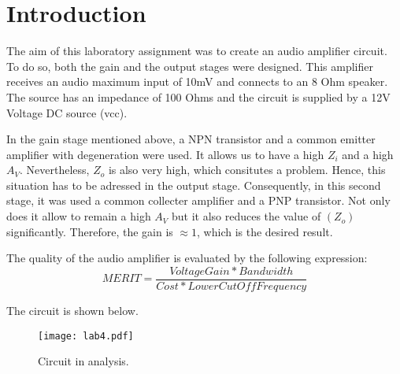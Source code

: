 \section{Introduction}
\label{introduction}


\par The aim of this laboratory assignment was to create an audio amplifier circuit. To do so, both the gain and the output stages were designed. This amplifier receives an audio maximum input of 10mV and connects to an 8 Ohm speaker. The source has an impedance of 100 Ohms and the circuit is supplied by a 12V Voltage DC source (vcc).
\par In the gain stage mentioned above, a NPN transistor and a common emitter amplifier with degeneration were used. It allows us to have a high $Z_{i}$ and a high $A_{V}$. Nevertheless, $Z_{o}$ is also very high, which consitutes a problem. Hence, this situation has to be adressed in the output stage. Consequently, in this second stage, it was used a common collecter amplifier and a PNP transistor. Not only does it allow to remain a high $A_{V}$ but it also reduces the value of $(Z_{o})$ significantly. Therefore, the gain is $\approx 1$, which is the desired result.

\par The quality of the audio amplifier is evaluated by the following expression:
\begin {equation}
	 MERIT = \frac{Voltage Gain*Bandwidth}{Cost*Lower Cut Off Frequency}   	
	\label{merit}
\end{equation}

The circuit is shown below.

\begin{figure}[ht] \centering
\texttt{[image: lab4.pdf]}
\caption{Circuit in analysis.}
\label{circuito todo}
\end{figure}


\newpage
